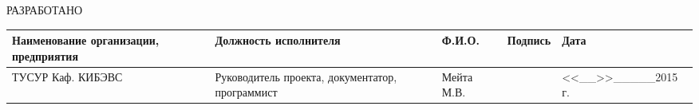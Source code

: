 \begin{center}
  РАЗРАБОТАНО
\end{center}

\begin{table}[ht]
\label{tab:developed}
\begin{center}
\begin{tabularx}{\linewidth}{|X|X|X|X|X|}
\hline
Наименование организации, предприятия & Должность исполнителя & Ф.И.О. & Подпись & Дата\\
\hline
ТУСУР Каф. КИБЭВС & Руководитель проекта, документатор, программист & Мейта М.В. & & <<\_\_>>\_\_\_\_\_2015 г. \\
\hline
\end{tabularx}
\end{center}
\end{table}
